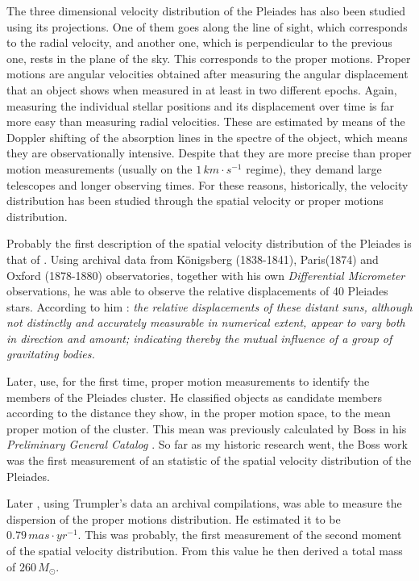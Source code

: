 The three dimensional velocity distribution of the Pleiades has also been studied using its projections. One of them goes along the line of sight, which corresponds to the radial velocity, and another one, which is perpendicular to the previous one, rests in the plane of the sky. This corresponds to the proper motions. Proper motions are angular velocities obtained after measuring the angular displacement that an object shows when measured in at least in two different epochs. Again, measuring the individual stellar positions and its displacement over time is far more easy than measuring radial velocities. These are estimated by means of the Doppler shifting of the absorption lines in the spectre of the object, which means they are observationally intensive.  Despite that they are more precise than proper motion measurements (usually on the $1 \,km\cdot s^{-1}$ regime), they demand large telescopes and longer observing times. For these reasons, historically, the velocity distribution has been studied through the spatial velocity or proper motions distribution. 

Probably the first description of the spatial velocity distribution of the Pleiades is that of \citet{1884MNRAS..44..355P}. Using archival data from  Königsberg (1838-1841), Paris(1874) and Oxford (1878-1880) observatories, together with his own \emph{Differential Micrometer} observations, he was able to observe the relative displacements of 40 Pleiades stars. According to him \citep{1884MNRAS..44..355P}: \textit{the relative displacements of these distant suns, although not distinctly and accurately measurable in numerical extent, appear to vary both in direction and amount; indicating thereby the mutual influence of a group of gravitating bodies.} 

Later, \citet{Trumpler1921} use, for the first time, proper motion measurements to identify the members of the Pleiades cluster. He classified objects as candidate members according to the distance they show, in the proper motion space, to the mean proper motion of the cluster. This mean was previously calculated by Boss in his \emph{Preliminary General Catalog} \citep{Trumpler1921}. So far as my historic research went, the Boss work was the first measurement of an statistic of the spatial velocity distribution of the Pleiades. 

Later \citet{1938AJ.....47...25T}, using Trumpler's data an archival compilations, was able to measure the dispersion of the proper motions distribution. He estimated it to be $0.79\,mas\cdot yr^{-1}$. This was probably, the first measurement of the second moment of the spatial velocity distribution. From this value he then derived a total mass of $260\,M_{\odot}$.

